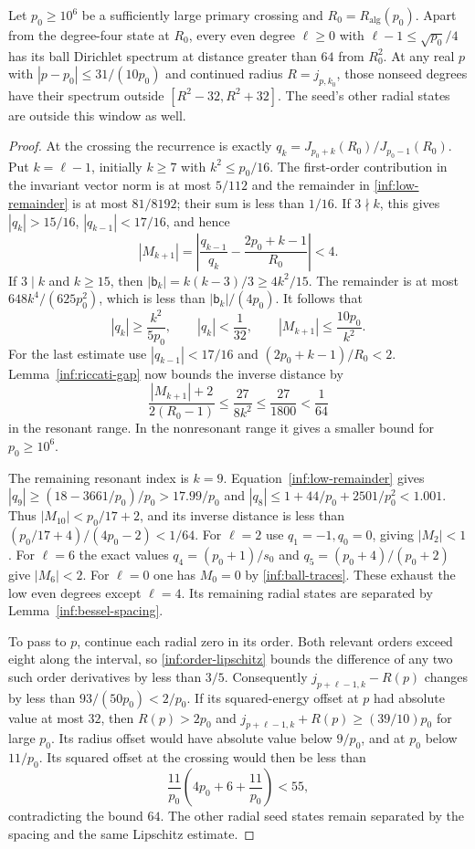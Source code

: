 \begin{proposition}\label{inf:low-exclusion}
Let $p_0\ge10^6$ be a sufficiently large primary crossing and
$R_0=R_{\mathrm{alg}}(p_0)$. Apart from the degree-four state at $R_0$,
every even degree $\ell\ge0$ with
$\ell-1\le\sqrt{p_0}/4$ has its ball Dirichlet spectrum at distance
greater than $64$ from $R_0^2$.
At any real $p$ with $|p-p_0|\le31/(10p_0)$ and continued radius
$R=j_{p,k_0}$, those nonseed degrees have their spectrum outside
$[R^2-32,R^2+32]$. The seed's other radial states are outside this
window as well.
\end{proposition}
\begin{proof}
At the crossing the recurrence is exactly
$q_k=J_{p_0+k}(R_0)/J_{p_0-1}(R_0)$.
Put $k=\ell-1$, initially $k\ge7$ with $k^2\le p_0/16$.
The first-order contribution in the invariant vector norm is at most
$5/112$ and the remainder in \eqref{inf:low-remainder} is at most
$81/8192$; their sum is less than $1/16$.
If $3\nmid k$, this gives $|q_k|>15/16$, $|q_{k-1}|<17/16$,
and hence
\[
 |M_{k+1}|=
 \left|\frac{q_{k-1}}{q_k}-\frac{2p_0+k-1}{R_0}\right|<4.
\]
If $3\mid k$ and $k\ge15$, then
$|\mathsf b_k|=k(k-3)/3\ge4k^2/15$. The remainder is at most
$648k^4/(625p_0^2)$, which is less than $|\mathsf b_k|/(4p_0)$.
It follows that
\[
 |q_k|\ge\frac{k^2}{5p_0},\qquad |q_k|<\frac1{32},
 \qquad |M_{k+1}|\le\frac{10p_0}{k^2}.
\]
For the last estimate use $|q_{k-1}|<17/16$ and
$(2p_0+k-1)/R_0<2$.
Lemma~\ref{inf:riccati-gap} now bounds the inverse distance by
\[
 \frac{|M_{k+1}|+2}{2(R_0-1)}
 \le\frac{27}{8k^2}\le\frac{27}{1800}<\frac1{64}
\]
in the resonant range. In the nonresonant range it gives a smaller
bound for $p_0\ge10^6$.

The remaining resonant index is $k=9$.
Equation~\eqref{inf:low-remainder} gives
$|q_9|\ge(18-3661/p_0)/p_0>17.99/p_0$ and
$|q_8|\le1+44/p_0+2501/p_0^2<1.001$.
Thus $|M_{10}|<p_0/17+2$, and its inverse distance is less than
$(p_0/17+4)/(4p_0-2)<1/64$.
For $\ell=2$ use $q_1=-1,q_0=0$, giving $|M_2|<1$.
For $\ell=6$ the exact values
$q_4=(p_0+1)/s_0$ and $q_5=(p_0+4)/(p_0+2)$ give $|M_6|<2$.
For $\ell=0$ one has $M_0=0$ by \eqref{inf:ball-traces}.
These exhaust the low even degrees except $\ell=4$.
Its remaining radial states are separated by Lemma~\ref{inf:bessel-spacing}.

To pass to $p$, continue each radial zero in its order.
Both relevant orders exceed eight along the interval, so
\eqref{inf:order-lipschitz} bounds the difference of any two such
order derivatives by less than $3/5$.
Consequently $j_{p+\ell-1,k}-R(p)$ changes by less than
$93/(50p_0)<2/p_0$.
If its squared-energy offset at $p$ had absolute value at
most $32$, then $R(p)>2p_0$ and
$j_{p+\ell-1,k}+R(p)\ge(39/10)p_0$ for large $p_0$.
Its radius offset would have absolute value below $9/p_0$,
and at $p_0$ below $11/p_0$. Its squared offset at the crossing
would then be less than
\[
 \frac{11}{p_0}\left(4p_0+6+\frac{11}{p_0}\right)<55,
\]
contradicting the bound $64$. The other radial seed states remain
separated by the spacing and the same Lipschitz estimate.
\end{proof}

